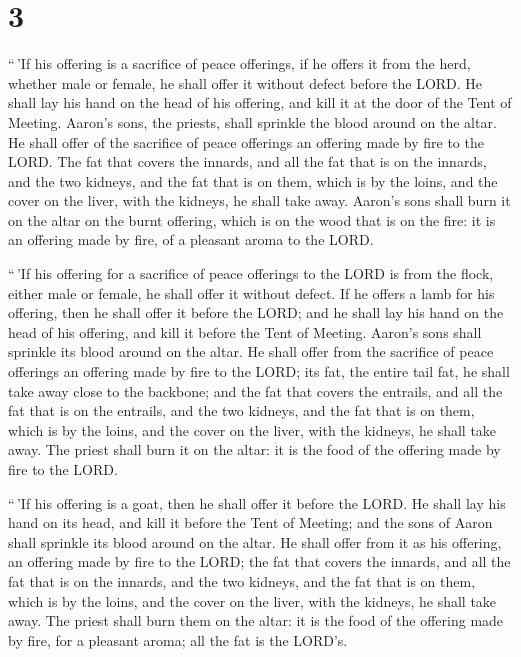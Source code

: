\hypertarget{section-2}{%
\section{3}\label{section-2}}

 ``\,'If his offering is a sacrifice of peace offerings, if
he offers it from the herd, whether male or female, he shall offer it
without defect before the LORD.  He shall lay his hand on
the head of his offering, and kill it at the door of the Tent of
Meeting. Aaron's sons, the priests, shall sprinkle the blood around on
the altar.  He shall offer of the sacrifice of peace
offerings an offering made by fire to the LORD. The fat that covers the
innards, and all the fat that is on the innards,  and the
two kidneys, and the fat that is on them, which is by the loins, and the
cover on the liver, with the kidneys, he shall take away. 
Aaron's sons shall burn it on the altar on the burnt offering, which is
on the wood that is on the fire: it is an offering made by fire, of a
pleasant aroma to the LORD.

 ``\,'If his offering for a sacrifice of peace offerings to
the LORD is from the flock, either male or female, he shall offer it
without defect.  If he offers a lamb for his offering, then
he shall offer it before the LORD;  and he shall lay his
hand on the head of his offering, and kill it before the Tent of
Meeting. Aaron's sons shall sprinkle its blood around on the altar.
 He shall offer from the sacrifice of peace offerings an
offering made by fire to the LORD; its fat, the entire tail fat, he
shall take away close to the backbone; and the fat that covers the
entrails, and all the fat that is on the entrails,  and the
two kidneys, and the fat that is on them, which is by the loins, and the
cover on the liver, with the kidneys, he shall take away. 
The priest shall burn it on the altar: it is the food of the offering
made by fire to the LORD.

 ``\,'If his offering is a goat, then he shall offer it
before the LORD.  He shall lay his hand on its head, and
kill it before the Tent of Meeting; and the sons of Aaron shall sprinkle
its blood around on the altar.  He shall offer from it as
his offering, an offering made by fire to the LORD; the fat that covers
the innards, and all the fat that is on the innards,  and
the two kidneys, and the fat that is on them, which is by the loins, and
the cover on the liver, with the kidneys, he shall take away.
 The priest shall burn them on the altar: it is the food of
the offering made by fire, for a pleasant aroma; all the fat is the
LORD's.


